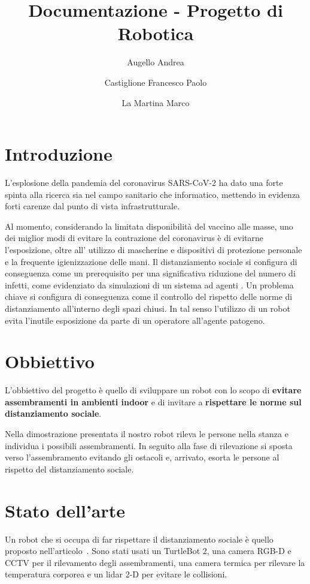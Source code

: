 \documentclass[a4paper]{article}
\begin{document}
	\title{Documentazione - Progetto di Robotica}
	\author{Augello Andrea \and Castiglione Francesco Paolo \and La Martina Marco}
	\maketitle
	\tableofcontents


	\section{Introduzione}\label{sec:Introduzione}
	L'esplosione della pandemia del coronavirus SARS-CoV-2 ha dato una forte
	spinta alla ricerca sia nel campo sanitario che informatico, mettendo in
	evidenza forti carenze dal punto di vista infrastrutturale.
	
	
	Al momento, considerando la limitata disponibilità del vaccino alle masse,
	uno dei miglior modi di evitare la contrazione del coronavirus è di
	evitarne l'esposizione, oltre all' utilizzo di mascherine e dispositivi di
	protezione personale e la frequente igienizzazione delle mani. Il
	distanziamento sociale si configura di conseguenza come un prerequisito per
	una significativa riduzione del numero di infetti, come evidenziato da
	simulazioni di un sistema ad agenti \cite{silva2020covid}. Un problema
	chiave si configura di conseguenza come il controllo del rispetto delle
	norme di distanziamento all'interno degli spazi chiusi. In tal senso
	l'utilizzo di un robot evita l'inutile esposizione da parte di un operatore
	all'agente patogeno. 
	
	\section{Obbiettivo}\label{sec:Obbiettivo} 
	L'obbiettivo del progetto è quello di sviluppare un robot con lo scopo di
	\textbf{evitare assembramenti in ambienti indoor} e di invitare a
	\textbf{rispettare le norme sul distanziamento sociale}. 
	
	Nella dimostrazione presentata il nostro robot rileva le persone nella
	stanza e individua i possibili assembramenti. In seguito alla fase di
	rilevazione si sposta verso l'assembramento evitando gli ostacoli e,
	arrivato, esorta le persone al rispetto del distanziamento sociale.
	
	\section{Stato dell'arte}\label{sec:Stato-dell-arte}
	Un robot che si occupa di far rispettare il distanziamento sociale è quello
	proposto nell'articolo~\cite{sathyamoorthy2020covidrobot}. Sono stati usati
	un TurtleBot 2, una camera RGB-D e CCTV per il rilevamento degli
	assembramenti, una camera termica per rilevare la temperatura corporea e un
	lidar 2-D per evitare le collisioni.
	
\end{document}
